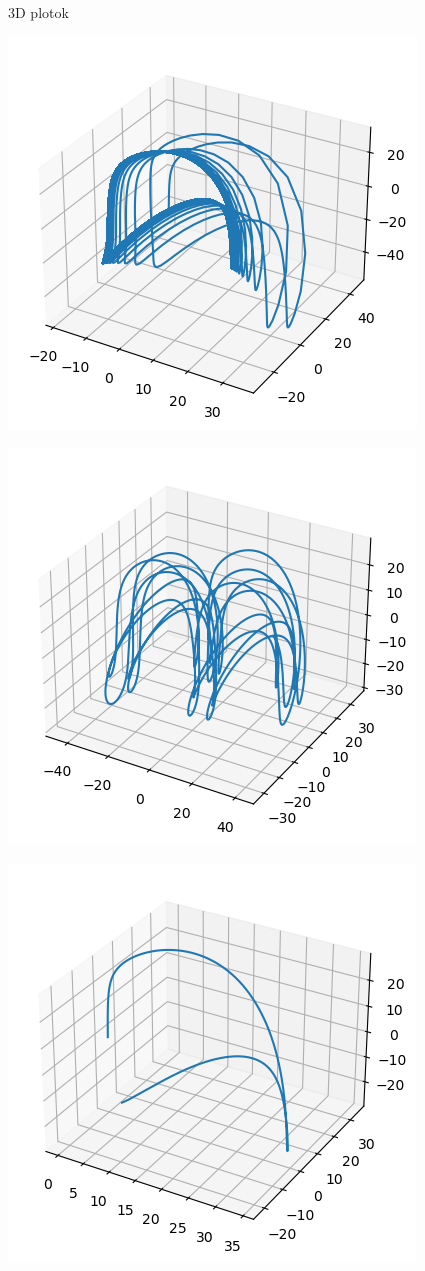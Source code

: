 \documentclass{article}
\begin{document}
3D plotok

\includegraphics[scale=1]{../plot_1.png} 

\includegraphics[scale=1]{../plot_2.png}

\includegraphics[scale=1]{../plot_6.png} 
 
\end{document}
